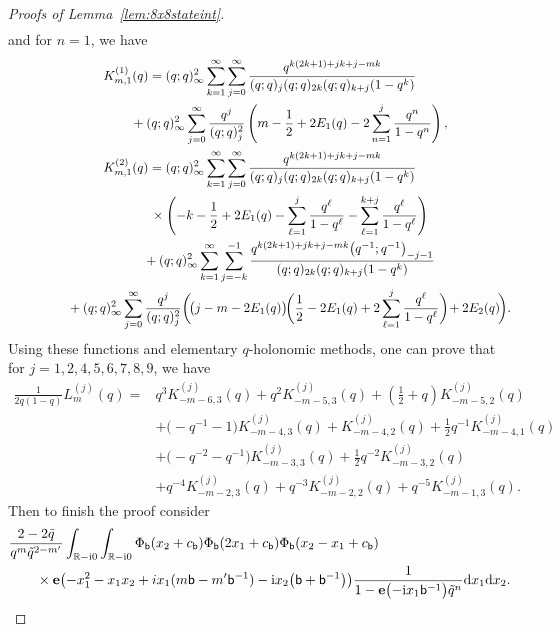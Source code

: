 \documentclass[pdftex]{sigma}
\numberwithin{equation}{section}
\def\BR{\mathbb{R}}
\def\tq{\tilde{q}}
\def\e{\mathbf e}
\def\BR{\mathbb R}
\def\tq{\tilde{q}}
\begin{document}
\begin{proof}[Proofs of Lemma~\ref{lem:8x8stateint}]
\begin{align}
\end{align}
and for $n=1$, we have
\begin{gather*}
 K^{(1)}_{m,1}(q)
 =
 (q;q)_{\infty}^2\sum_{k=1}^{\infty}\sum_{j=0}^{\infty}\frac{q^{k(2k+1)+jk+j-mk}}{(q;q)_{j}(q;q)_{2k}(q;q)_{k+j}(1-q^{k})}\\
 \hphantom{K^{(1)}_{m,1}(q)=}{}
 +(q;q)_{\infty}^2\sum_{j=0}^{\infty}\frac{q^{j}}{(q;q)_{j}^2}\left(m-\frac{1}{2}+2E_{1}(q)-2\sum_{n=1}^{j}\frac{q^n}{1-q^n}\right),
 \\
 K^{(2)}_{m,1}(q)
 =
 (q;q)_{\infty}^2\sum_{k=1}^{\infty}\sum_{j=0}^{\infty}
 \frac{q^{k(2k+1)+jk+j-mk}}{(q;q)_{j}(q;q)_{2k}(q;q)_{k+j}(1-q^{k})}\\
 \hphantom{K^{(2)}_{m,1}(q)=}{} \times
 \left(-k-\frac{1}{2}+2E_{1}(q)-\sum_{\ell=1}^{j}\frac{q^\ell}{1-q^\ell}-\sum_{\ell=1}^{k+j}\frac{q^\ell}{1-q^\ell}\right)\\
 \hphantom{K^{(2)}_{m,1}(q)=}{}+(q;q)_{\infty}^2\sum_{k=1}^{\infty}\sum_{j=-k}^{-1}
 \frac{q^{k(2k+1)+jk+j-mk}\bigl(q^{-1};q^{-1}\bigr)_{-j-1}}{(q;q)_{2k}(q;q)_{k+j}(1-q^{k})}\\
 \hphantom{K^{(2)}_{m,1}(q)=}{}+(q;q)_{\infty}^2\sum_{j=0}^{\infty}
 \frac{q^{j}}{(q;q)_{j}^2}\biggl(\!\bigl(j-m-2E_1(q)\bigr)
 \!\biggl(\frac{1}{2}-2E_1(q)+2\sum_{\ell=1}^{j}\frac{q^\ell}{1-q^\ell}\biggr)\!+2E_2(q)\!\biggr).
\end{gather*}
Using these functions and elementary $q$-holonomic methods, one can prove that for $j=1,2,4,5,\allowbreak 6,7,8,9$, we have
\begin{align}
 \frac{1}{2q(1-q)}L^{(j)}_{m}(q)
 ={}&q^{3}K^{(j)}_{-m-6,3}(q)
 +q^{2}K^{(j)}_{-m-5,3}(q) + \left(\frac{1}{2} + q\right)K^{(j)}_{-m-5,2}(q)\nonumber\\
 & +\bigl(-q^{-1} - 1\bigr)K^{(j)}_{-m-4,3}(q) + K^{(j)}_{-m-4,2}(q) + \frac{1}{2}q^{-1}K^{(j)}_{-m-4,1}(q)\nonumber\\
 & +\bigl(-q^{-2} - q^{-1}\bigr)K^{(j)}_{-m-3,3}(q) + \frac{1}{2}q^{-2}K^{(j)}_{-m-3,2}(q)\nonumber\\
 & +q^{-4}K^{(j)}_{-m-2,3}(q) + q^{-3}K^{(j)}_{-m-2,2}(q)
 +q^{-5}K^{(j)}_{-m-1,3}(q) .\label{eq:LinK.gen}
\end{align}
Then to finish the proof consider
\begin{align*}
 &\frac{2-2\tq}{q^{m}\tq^{2-m'}}\int_{\BR-{\rm i} 0}\int_{\BR-{\rm i}0}\Phi_{\mathsf{b}}(x_2+c_{\mathsf{b}})\Phi_{\mathsf{b}}(2x_1+c_{\mathsf{b}})\Phi_{\mathsf{b}}(x_2-x_1+c_{\mathsf{b}})\\
 &\qquad{}\times\e\bigl(-x_1^2-x_1x_2+ix_1(m\mathsf{b}-m'\mathsf{b}^{-1})-{\rm i} x_2\bigl(\mathsf{b}+\mathsf{b}^{-1}\bigr)\bigr)\frac{1}{1-\e\bigl(-{\rm i}x_1\mathsf{b}^{-1}\bigr)\tq^n} {\rm d}x_1{\rm d}x_2 .

\end{align*}
\end{proof}
\end{document}
